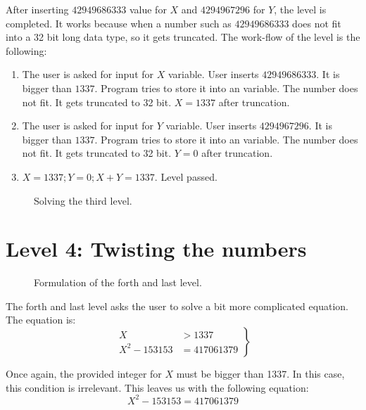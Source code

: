 After inserting $42949686333$ value for $X$ and $4294967296$ for $Y$, the level is completed. It works because when a number such as  $42949686333$ does not fit into a 32 bit long  data type, so it gets truncated. The work-flow of the level is the following:
\begin{enumerate}
	\item{The user is asked for input for $X$ variable. User inserts $42949686333$. It is bigger than $1337$. Program tries to store it into an  variable. The number does not fit. It gets truncated to 32 bit. $X = 1337$ after truncation. }
	\item{The user is asked for input for $Y$ variable. User inserts $4294967296$. It is bigger than $1337$. Program tries to store it into an  variable. The number does not fit. It gets truncated to 32 bit. $Y = 0$ after truncation.}
	\item{$X = 1337; Y = 0; X + Y = 1337$. Level passed. }
\end{enumerate}


\begin{figure}[!h]
	\caption{Solving the third level.}
	\label{fig:solved_level3}
\end{figure}
\clearpage
\section{Level 4: Twisting the numbers}

\begin{figure}[!htbp]
	\caption{Formulation of the forth and last level.}
	\label{fig:intro_level4}
\end{figure}

The forth and last level asks the user to solve a bit more complicated equation. The equation is:
\begin{equation*}
	\left.\begin{aligned}
		X &> 1337\\
		X^2 - 153153 &= 417061379
	\end{aligned}
	\right\}
\end{equation*}

Once again, the provided integer for $X$ must be bigger than 1337. In this case, this condition is irrelevant. This leaves us with the following equation:
\begin{equation*}
	X^2 - 153153 = 417061379
\end{equation*}

